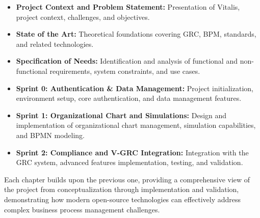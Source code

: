 \begin{itemize}
\item \textbf{Project Context and Problem Statement:} Presentation of Vitalis, project context, challenges, and objectives.
\item \textbf{State of the Art:} Theoretical foundations covering GRC, BPM, standards, and related technologies.
\item \textbf{Specification of Needs:} Identification and analysis of functional and non-functional requirements, system constraints, and use cases.
\item \textbf{Sprint 0: Authentication \& Data Management:} Project initialization, environment setup, core authentication, and data management features.
\item \textbf{Sprint 1: Organizational Chart and Simulations:} Design and implementation of organizational chart management, simulation capabilities, and BPMN modeling.
\item \textbf{Sprint 2: Compliance and V-GRC Integration:} Integration with the GRC system, advanced features implementation, testing, and validation.
\end{itemize}

Each chapter builds upon the previous one, providing a comprehensive view of the project from conceptualization through implementation and validation, demonstrating how modern open-source technologies can effectively address complex business process management challenges.